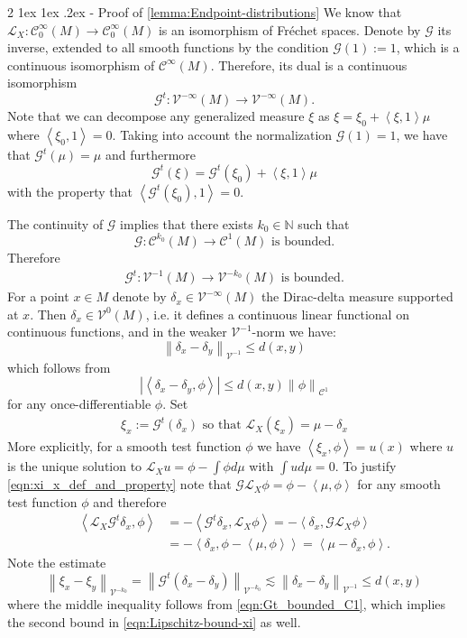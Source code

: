 \documentclass[11pt]{amsart}
\makeatletter
\renewcommand{\subsection}
{\@startsection{subsection}
				     {2}
				     {\z@}%
                     {-3.25ex\@plus -1ex \@minus -.2ex}%
                     {1.5ex \@plus .2ex}%
                     {\normalfont \large \bfseries \sffamily}}%
\newcommand \cC {\mathcal{C}}
\newcommand \cV {\mathcal{V}}
\newcommand \cL {\mathcal{L}}
\newcommand \cG {\mathcal{G}}
\newcommand \bN {\mathbb{N}}
\newcommand{\ip}[1]{\left\langle#1\right\rangle}
\newcommand{\Frechet}     {\xspace{{F}r\'echet}\xspace}
\newcommand{\leqapprox}{\lesssim}
\newcommand{\norm}[1]{\left\|#1\right\|}
\theoremstyle{mytheoremstyle}
\theoremstyle{mydefinitionstyle}
\theoremstyle{mytheoremstyle}
\numberwithin{equation}{section}
\renewcommand{\subsection}
{\@startsection{subsection}
                     {2}
                     {\z@}%
                     {1ex \@plus1ex \@minus.2ex}%
                     {-\fontdimen 2\font }
                     {\normalfont\normalsize\bfseries}}
\theoremstyle{mydefinitionstyle}
\makeatother
\begin{document}



\subsection{Proof of \autoref{lemma:Endpoint-distributions}}
	\label{ssec:proof_of_endpoint_distributions}
We know that $\cL_X\colon \cC^\infty_0(M)\to \cC^\infty_0(M)$ is an isomorphism of \Frechet spaces.
Denote by $\cG$ its inverse, extended to all smooth functions by the condition $\cG(1):=1$, which is a continuous isomorphism of $\cC^\infty(M)$.
Therefore, its dual is a continuous isomorphism
\[
	\cG^t \colon \cV^{-\infty}(M) \to \cV^{-\infty}(M).
\]
Note that we can decompose any generalized measure $\xi$ as $\xi = \xi_0 + \ip{\xi,1}\mu$ where $\ip{\xi_0,1}=0$.
Taking into account the normalization $\cG(1)=1$, we have that $\cG^t(\mu)=\mu$ and furthermore
\[
	\cG^t(\xi) = \cG^t(\xi_0) + \ip{\xi,1}\mu
\]
with the property that $\ip{\cG^t(\xi_0),1}=0$.

The continuity of $\cG$ implies that there exists $k_0\in \bN$ such that
\[
	\cG\colon \cC^{k_0}(M) \to \cC^1(M) \text{ is bounded}.
\]
Therefore
\begin{align}
	\label{eqn:Gt_bounded_C1}
	\cG^t\colon \cV^{-1}(M) \to \cV^{-k_0}(M) \text{ is bounded}.
\end{align}
For a point $x\in M$ denote by $\delta_x\in \cV^{-\infty}(M)$ the Dirac-delta measure supported at $x$.
Then $\delta_x\in \cV^0(M)$, i.e. it defines a continuous linear functional on continuous functions, and in the weaker $\cV^{-1}$-norm we have:
\[
	\norm{\delta_x-\delta_y}_{\cV^{-1}} \leq d(x,y)
\]
which follows from
\[
	|\ip{\delta_x-\delta_y,\phi}|\leq d(x,y)\norm{\phi}_{\cC^1}
\]
for any once-differentiable $\phi$.
Set
\begin{align}
	\label{eqn:xi_x_def_and_property}
	\xi_x:=\cG^t(\delta_x) \text{ so that }
	\cL_X(\xi_x) = \mu - \delta_x
\end{align}
More explicitly, for a smooth test function $\phi$ we have $\ip{\xi_x,\phi}=u(x)$ where $u$ is the unique solution to $\cL_X u = \phi - \int\! \phi d\mu$ with $\int\! ud\mu = 0$.
To justify \autoref{eqn:xi_x_def_and_property} note that $\cG \cL_X \phi = \phi - \ip{\mu,\phi}$ for any smooth test function $\phi$ and therefore
\begin{align*}
	\ip{\cL_X \cG^t \delta_x, \phi} & = 
	- \ip{\cG^t\delta_x, \cL_X \phi}
	= -\ip{\delta_x,\cG \cL_X\phi}\\
	& = 
	-\ip{\delta_x, \phi - \ip{\mu,\phi}}
	= \ip{\mu - \delta_x, \phi}.
\end{align*}
Note the estimate
\[
	\norm{\xi_x-\xi_y}_{\cV^{-k_0}}
	=
	\norm{\cG^t(\delta_x-\delta_y)}_{\cV^{-k_0}}
	\leqapprox
	\norm{\delta_x-\delta_y}_{\cV^{-1}}
	\leq
	d(x,y)
\]
where the middle inequality follows from \autoref{eqn:Gt_bounded_C1}, which implies the second bound in \autoref{eqn:Lipschitz-bound-xi} as well.
\end{document}

